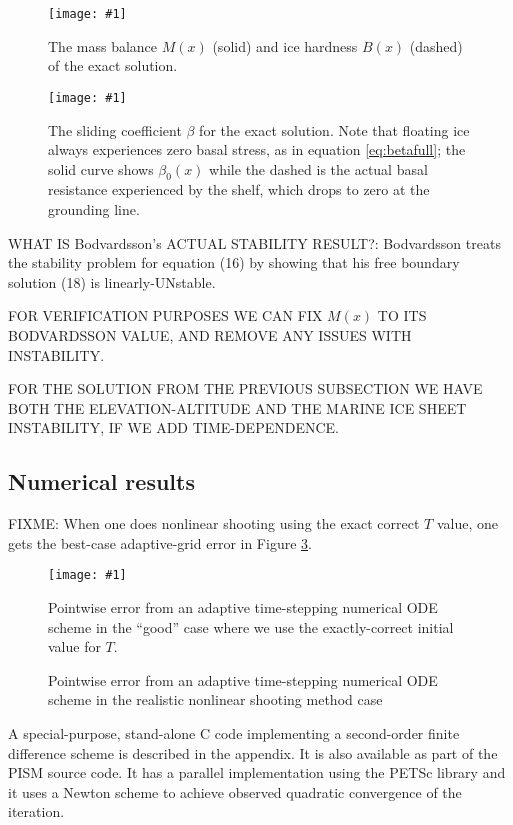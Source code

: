 \documentclass[twocolumn,letterpaper]{igs}
\newcommand{\onecol}[1]{\texttt{[image: \#1]}}
\begin{document}
\begin{figure}[ht]
\onecol{exactmarine-M-B}
\caption{The mass balance $M(x)$ (solid) and ice hardness $B(x)$ (dashed) of the exact solution.} \label{fig:exactMB}
\end{figure}

\begin{figure}[ht]
\onecol{exactmarine-beta}
\caption{The sliding coefficient $\beta$ for the exact solution.  Note that floating ice always experiences zero basal stress, as in equation \eqref{eq:betafull}; the solid curve shows $\beta_0(x)$ while the dashed is the actual basal resistance experienced by the shelf, which drops to zero at the grounding line.} \label{fig:exactbeta}
\end{figure}


WHAT IS Bodvardsson's ACTUAL STABILITY RESULT?:  Bodvardsson treats the stability problem for equation (16) by showing that his free boundary solution (18) is linearly-UNstable.

FOR VERIFICATION PURPOSES WE CAN FIX $M(x)$ TO ITS BODVARDSSON VALUE, AND REMOVE ANY ISSUES WITH INSTABILITY.

FOR THE SOLUTION FROM THE PREVIOUS SUBSECTION WE HAVE BOTH THE ELEVATION-ALTITUDE AND THE MARINE ICE SHEET INSTABILITY, IF WE ADD TIME-DEPENDENCE.



\subsection*{Numerical results}

FIXME:  When one does nonlinear shooting using the exact correct $T$ value, one gets the best-case adaptive-grid error in Figure \ref{fig:shoot-good-error}.

\begin{figure}[ht]
\onecol{exactmarine-good-error}
\caption{Pointwise error from an adaptive time-stepping numerical ODE scheme in the ``good'' case where we use the exactly-correct initial value for $T$.} \label{fig:shoot-good-error}
\end{figure}

\begin{figure}[ht]
\caption{Pointwise error from an adaptive time-stepping numerical ODE scheme in the realistic nonlinear shooting method case} \label{fig:shoot-error}
\end{figure}

A special-purpose, stand-alone C code implementing a second-order finite difference scheme is described in the appendix.  It is also available as part of the PISM source code.  It has a parallel implementation using the PETSc \citep{petsc-user-ref} library and it uses a Newton scheme to achieve observed quadratic convergence of the iteration.
\end{document}
